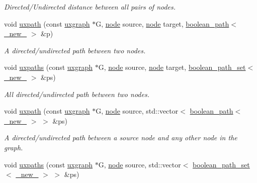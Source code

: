 \begin{DoxyCompactItemize}
\begin{DoxyCompactList}\small\item\em Directed/\+Undirected distance between all pairs of nodes. \end{DoxyCompactList}\item 
void \hyperlink{namespacelgraph_1_1traversal_a5873d9c87596daa9002ee537e1ac0252}{uxpath} (const \hyperlink{classlgraph_1_1uxgraph}{uxgraph} $\ast$G, \hyperlink{namespacelgraph_a397169dd66adf725210a30fb7251773e}{node} source, \hyperlink{namespacelgraph_a397169dd66adf725210a30fb7251773e}{node} target, \hyperlink{classlgraph_1_1boolean__path}{boolean\+\_\+path}$<$ \hyperlink{namespacelgraph_a2836f966c1c36b43da337d8907728ec0}{\+\_\+new\+\_\+} $>$ \&p)
\begin{DoxyCompactList}\small\item\em A directed/undirected path between two nodes. \end{DoxyCompactList}\item 
void \hyperlink{namespacelgraph_1_1traversal_a7421bd43fdc27c34609cb21b6ca99f84}{uxpaths} (const \hyperlink{classlgraph_1_1uxgraph}{uxgraph} $\ast$G, \hyperlink{namespacelgraph_a397169dd66adf725210a30fb7251773e}{node} source, \hyperlink{namespacelgraph_a397169dd66adf725210a30fb7251773e}{node} target, \hyperlink{namespacelgraph_afad432931ba600ab1628d5c9595986c5}{boolean\+\_\+path\+\_\+set}$<$ \hyperlink{namespacelgraph_a2836f966c1c36b43da337d8907728ec0}{\+\_\+new\+\_\+} $>$ \&ps)
\begin{DoxyCompactList}\small\item\em All directed/undirected path between two nodes. \end{DoxyCompactList}\item 
void \hyperlink{namespacelgraph_1_1traversal_a3a4182e7eb9e55c497118ba6c79d0b2d}{uxpath} (const \hyperlink{classlgraph_1_1uxgraph}{uxgraph} $\ast$G, \hyperlink{namespacelgraph_a397169dd66adf725210a30fb7251773e}{node} source, std\+::vector$<$ \hyperlink{classlgraph_1_1boolean__path}{boolean\+\_\+path}$<$ \hyperlink{namespacelgraph_a2836f966c1c36b43da337d8907728ec0}{\+\_\+new\+\_\+} $>$ $>$ \&ps)
\begin{DoxyCompactList}\small\item\em A directed/undirected path between a source node and any other node in the graph. \end{DoxyCompactList}\item 
void \hyperlink{namespacelgraph_1_1traversal_acac4a7dbf4378142e0d3a58a23716039}{uxpaths} (const \hyperlink{classlgraph_1_1uxgraph}{uxgraph} $\ast$G, \hyperlink{namespacelgraph_a397169dd66adf725210a30fb7251773e}{node} source, std\+::vector$<$ \hyperlink{namespacelgraph_afad432931ba600ab1628d5c9595986c5}{boolean\+\_\+path\+\_\+set}$<$ \hyperlink{namespacelgraph_a2836f966c1c36b43da337d8907728ec0}{\+\_\+new\+\_\+} $>$ $>$ \&ps)

\end{DoxyCompactItemize}
